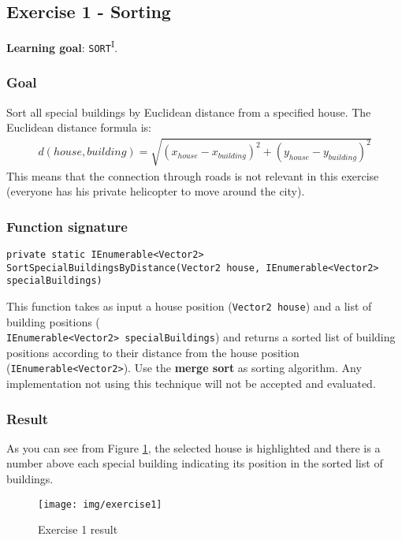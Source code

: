 \newpage
\subsection*{Exercise 1 - Sorting}
\textbf{Learning goal}: \texttt{SORT}\textsuperscript{I}. \\

\subsubsection*{Goal}
Sort all special buildings by Euclidean distance from a specified house. The Euclidean distance formula is:
\begin{align*}
d(house,building) = \sqrt{(x_{house} - x_{building})^{2} + (y_{house} - y_{building})^{2} } 
\end{align*}
This means that the connection through roads is not relevant in this exercise (everyone has his private helicopter to move around the city).

\subsubsection*{Function signature} 
\begin{lstlisting}
private static IEnumerable<Vector2> SortSpecialBuildingsByDistance(Vector2 house, IEnumerable<Vector2> specialBuildings)
\end{lstlisting}

This function takes as input a house position (\texttt{Vector2 house}) and a list of building positions (\\ \texttt{IEnumerable<Vector2> specialBuildings}) and returns a sorted list of building positions according to their distance from the house position (\texttt{IEnumerable<Vector2>}). Use the \textbf{merge sort} as sorting algorithm. Any implementation not using this technique will not be accepted and evaluated.\\

\subsubsection*{Result}
As you can see from Figure \ref{img:Ex1}, the selected house is highlighted and there is a number above each special building indicating its position in the sorted list of buildings. 

\begin{figure}[!h]
\centering
\texttt{[image: img/exercise1]}
\caption{Exercise 1 result}
\label{img:Ex1}
\end{figure}

